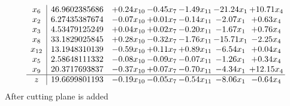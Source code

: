 \documentclass[8pt]{article}
\begin{document}
\[\begin{array}{c| c c@{\hskip 2pt} c@{\hskip 2pt} c@{\hskip 2pt} c@{\hskip 2pt} c@{\hskip 2pt} }
 x_{6}   &  46.9602385686 & +  0.24 x_{10} & -0.45 x_{7} & -1.49 x_{11} & -21.24 x_{1} & + 10.71 x_{4}\\
 x_{2}   &  6.27435387674 & -0.07 x_{10} & +  0.01 x_{7} & -0.14 x_{11} & -2.07 x_{1} & +  0.63 x_{4}\\
 x_{3}   &  4.53479125249 & +  0.04 x_{10} & +  0.02 x_{7} & -0.20 x_{11} & -1.67 x_{1} & +  0.76 x_{4}\\
 x_{8}   &  33.1829025845 & +  0.28 x_{10} & -0.32 x_{7} & -1.76 x_{11} & -15.71 x_{1} & -2.25 x_{4}\\
 x_{12}   &  13.1948310139 & -0.59 x_{10} & +  0.11 x_{7} & +  0.89 x_{11} & -6.54 x_{1} & +  0.04 x_{4}\\
 x_{5}   &  2.58648111332 & -0.08 x_{10} & -0.09 x_{7} & -0.07 x_{11} & -1.26 x_{1} & +  0.34 x_{4}\\
 x_{9}   &  20.3717693837 & -0.37 x_{10} & +  0.07 x_{7} & -0.70 x_{11} & -4.34 x_{1} & + 12.15 x_{4}\\
\hline
z    &  19.6699801193 & -0.19 x_{10} & -0.05 x_{7} & -0.54 x_{11} & -8.06 x_{1} & -0.64 x_{4}\\
\end{array}\]
 After cutting plane is added 
\end{document}
